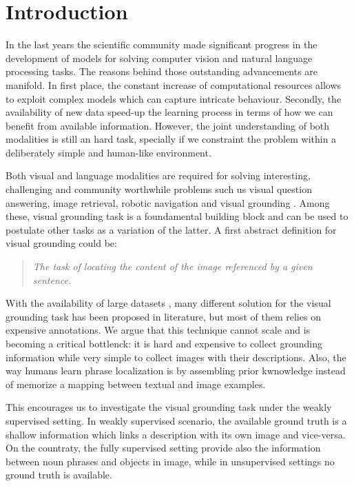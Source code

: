 \chapter{Introduction}
\label{introduction}

In the last years the scientific community made significant progress
in the development of models for solving computer vision and natural
language processing tasks. The reasons behind those outstanding
advancements are manifold. In first place, the constant increase of
computational resources allows to exploit complex models which can
capture intricate behaviour. Secondly, the availability of new data
speed-up the learning process in terms of how we can benefit from
available information. However, the joint understanding of both
modalities is still an hard task, specially if we constraint the
problem within a deliberately simple and human-like environment.

Both visual and language modalities are required for solving
interesting, challenging and community worthwhile problems such us
visual question answering, image retrieval, robotic navigation and
visual grounding . Among these, visual grounding
task is a foundamental building block and can be used to postulate
other tasks as a variation of the latter. A first abstract definition
for visual grounding could be:

\begin{quote}
    \textit{The task of locating the content of the image referenced
    by a given sentence.}
\end{quote}

With the availability of large datasets ,
many different solution for the visual grounding task has been
proposed in literature, but most of them relies on expensive
annotations. We argue that this technique cannot scale and is becoming
a critical bottlenck: it is hard and expensive to collect grounding
information while very simple to collect images with their
descriptions. Also, the way humans learn phrase localization is by
assembling prior kwnowledge instead of memorize a mapping between
textual and image examples.

This encourages us to investigate the visual grounding task under the
weakly supervised setting. In weakly supervised scenario, the
available ground truth is a shallow information which links a
description with its own image and vice-versa. On the countraty, the
fully supervised setting provide also the information between noun
phrases and objects in image, while in unsupervised settings no ground
truth is available.

